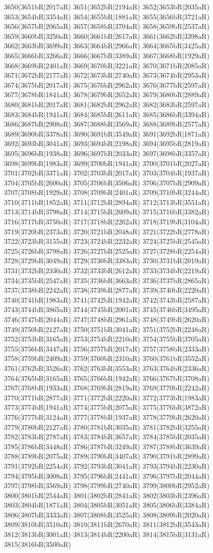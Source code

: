 3650(3651bR|2017aR) 3651(3652bR|2194aR) 3652(3653bR|2035aR) 3653(3654bR|3354aR) 3654(3655bR|1881aR) 3655(3656bR|3721aR) 3656(3657bR|2065aR) 3657(3658bR|3704aR) 3658(3659bR|2537aR) 3659(3660bR|3250aR) 3660(3661bR|2617aR) 3661(3662bR|3398aR) 3662(3663bR|3699aR) 3663(3664bR|2966aR) 3664(3665bR|3425aR) 3665(3666bR|3266aR) 3666(3667bR|3389aR) 3667(3668bR|1929aR) 3668(3669bR|2401aR) 3669(3670bR|3221aR) 3670(3671bR|2085aR) 3671(3672bR|2177aR) 3672(3673bR|2740aR) 3673(3674bR|2953aR) 3674(3675bR|2017aR) 3675(3676bR|2962aR) 3676(3677bR|2597aR) 3677(3678bR|1841aR) 3678(3679bR|2652aR) 3679(3680bR|2889aR) 3680(3681bR|2017aR) 3681(3682bR|2962aR) 3682(3683bR|2597aR) 3683(3684bR|1941aR) 3684(3685bR|2611aR) 3685(3686bR|3394aR) 3686(3687bR|2908aR) 3687(3688bR|3569aR) 3688(3689bR|2577aR) 3689(3690bR|3378aR) 3690(3691bR|3549aR) 3691(3692bR|1871aR) 3692(3693bR|3041aR) 3693(3694bR|2198aR) 3694(3695bR|2819aR) 3695(3696bR|1938aR) 3696(3697bR|2033aR) 3697(3698bR|3357aR) 3698(3699bR|1983aR) 3699(3700bR|1941aR) 3700(3701bR|2027aR) 3701(3702bR|3371aR) 3702(3703bR|2017aR) 3703(3704bR|1937aR) 3704(3705bR|2600aR) 3705(3706bR|3506aR) 3706(3707bR|2909aR) 3707(3708bR|1929aR) 3708(3709bR|2401aR) 3709(3710bR|3244aR) 3710(3711bR|1852aR) 3711(3712bR|2894aR) 3712(3713bR|3551aR) 3713(3714bR|3798aR) 3714(3715bR|2609aR) 3715(3716bR|3382aR) 3716(3717bR|3750aR) 3717(3718bR|2262aR) 3718(3719bR|3104aR) 3719(3720bR|2373aR) 3720(3721bR|2048aR) 3721(3722bR|2778aR) 3722(3723bR|3155aR) 3723(3724bR|2232aR) 3724(3725bR|2545aR) 3725(3726bR|3798aR) 3726(3727bR|2525aR) 3727(3728bR|2254aR) 3728(3729bR|3049aR) 3729(3730bR|3383aR) 3730(3731bR|2019aR) 3731(3732bR|2330aR) 3732(3733bR|2612aR) 3733(3734bR|2219aR) 3734(3735bR|2547aR) 3735(3736bR|3663aR) 3736(3737bR|2865aR) 3737(3738bR|2242aR) 3738(3739bR|2877aR) 3739(3740bR|2220aR) 3740(3741bR|1983aR) 3741(3742bR|1942aR) 3742(3743bR|2587aR) 3743(3744bR|3865aR) 3744(3745bR|2001aR) 3745(3746bR|3495aR) 3746(3747bR|2044aR) 3747(3748bR|2961aR) 3748(3749bR|2620aR) 3749(3750bR|2127aR) 3750(3751bR|3041aR) 3751(3752bR|2248aR) 3752(3753bR|3165aR) 3753(3754bR|2210aR) 3754(3755bR|3705aR) 3755(3756bR|3447aR) 3756(3757bR|2017aR) 3757(3758bR|2333aR) 3758(3759bR|2409aR) 3759(3760bR|2310aR) 3760(3761bR|3552aR) 3761(3762bR|3526aR) 3762(3763bR|3553aR) 3763(3764bR|2336aR) 3764(3765bR|3165aR) 3765(3766bR|1942aR) 3766(3767bR|3708aR) 3767(3768bR|1933aR) 3768(3769bR|2819aR) 3769(3770bR|2242aR) 3770(3771bR|2877aR) 3771(3772bR|2220aR) 3772(3773bR|1983aR) 3773(3774bR|1941aR) 3774(3775bR|2075aR) 3775(3776bR|3872aR) 3776(3777bR|3124aR) 3777(3778bR|1937aR) 3778(3779bR|2620aR) 3779(3780bR|2127aR) 3780(3781bR|3035aR) 3781(3782bR|3255aR) 3782(3783bR|2787aR) 3783(3784bR|3657aR) 3784(3785bR|2035aR) 3785(3786bR|3448aR) 3786(3787bR|3249aR) 3787(3788bR|3639aR) 3788(3789bR|2075aR) 3789(3790bR|3407aR) 3790(3791bR|2899aR) 3791(3792bR|2254aR) 3792(3793bR|3041aR) 3793(3794bR|2230aR) 3794(3795bR|3008aR) 3795(3796bR|2441aR) 3796(3797bR|2044aR) 3797(3798bR|3569aR) 3798(3799bR|2740aR) 3799(3800bR|2952aR) 3800(3801bR|2544aR) 3801(3802bR|2841aR) 3802(3803bR|2396aR) 3803(3804bR|1871aR) 3804(3805bR|3051aR) 3805(3806bR|3384aR) 3806(3807bR|3333aR) 3807(3808bR|3525aR) 3808(3809bR|2020aR) 3809(3810bR|3510aR) 3810(3811bR|2670aR) 3811(3812bR|3543aR) 3812(3813bR|3001aR) 3813(3814bR|2200aR) 3814(3815bR|3131aR) 3815(3816bR|3500aR) 